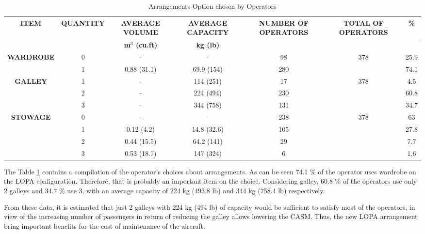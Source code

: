 \begin{table}[htbp]
  \centering
  \caption{Arrangements-Option chosen by Operators}
    \begin{tabular}{rcccccc}
    \toprule
    \multicolumn{1}{c}{\multirow{2}[2]{*}{\textbf{ITEM}}} & \multirow{2}[2]{*}{\textbf{QUANTITY}} & \textbf{AVERAGE VOLUME} & \textbf{AVERAGE CAPACITY} & \multirow{2}[2]{*}{\textbf{NUMBER OF OPERATORS}} & \multirow{2}[2]{*}{\textbf{TOTAL OF OPERATORS}} & \multirow{2}[2]{*}{\textbf{\%}} \\
    \midrule
    \multicolumn{1}{c}{} &       & \textbf{m$^{3}$ (cu.ft)} & \textbf{kg (lb)} &       &       &  \\
    \multicolumn{1}{c}{\textbf{WARDROBE}} & 0     & -     & -     & 98    & 378   & 25.9 \\
    \multicolumn{1}{c}{\textbf{}} & 1     & 0.88 (31.1) & 69.9 (154) & 280   &       & 74.1 \\
    \multicolumn{1}{c}{\textbf{GALLEY}} & 1     & -     & 114  (251) & 17    & 378   & 4.5 \\
    \multicolumn{1}{c}{\textbf{}} & 2     & -     & 224 (494) & 230   &       & 60.8 \\
    \multicolumn{1}{c}{\textbf{}} & 3     & -     & 344 (758) & 131   &       & 34.7 \\
    \multicolumn{1}{c}{\textbf{STOWAGE}} & 0     & -     & -     & 238   & 378   & 63 \\
    \textbf{} & 1     & 0.12 (4.2) & 14.8 (32.6) & 105   &       & 27.8 \\
    \textbf{} & 2     & 0.44 (15.5) & 64.2 (141) & 29    &       & 7.7 \\
    \textbf{} & 3     & 0.53 (18.7) & 147 (324) & 6     &       & 1.6 \\
    \bottomrule
    \end{tabular}%
  \label{tab:OpratorArrangementOption}%
\end{table}%



The Table \ref{tab:OpratorArrangementOption} contains a compilation of the operator's choices about arrangements. As can be seen 74.1 \% of the operator uses wardrobe on the LOPA configuration. Therefore, that is probably an important item on the choice. Considering galley, 60.8 \% of the operators use only 2 galleys and 34.7 \% use 3, with an average capacity of 224 kg (493.8 lb) and 344 kg (758.4 lb) respectively.


From these data, it is estimated that just 2 galleys with 224 kg (494 lb) of capacity would be sufficient to satisfy most of the operators, in view of the increasing number of passengers in return of reducing the galley allows lowering the CASM. Thus, the new LOPA arrangement bring important benefits for the cost of maintenance of the aircraft.


